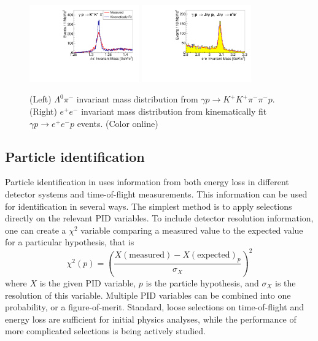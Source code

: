 \begin{figure}[tpb]
\begin{center}
\includegraphics[width=0.42\textwidth]{figures/XimMass_2017-ver30.pdf}
\includegraphics[width=0.42\textwidth]{figures/jpsi_mass.pdf}
\caption{\label{fig:invmass2}
(Left) $\Lambda^0\pi^-$ invariant mass distribution from $\gamma p \to K^+ K^+ \pi^- \pi^- p$. (Right) $e^+e^-$ invariant mass distribution from kinematically fit $\gamma p \to e^+e^- p$ events. (Color online)}
\end{center}
\end{figure}

\subsection{Particle identification \label{sec:perfpid}}

Particle identification in \gx{} uses information from both energy loss in different detector systems and time-of-flight measurements.  This information can be used for identification in several ways.  The simplest method is to apply selections directly on the relevant PID variables.  To include detector resolution information, one can create a $\chi^2$ variable comparing a measured value to the expected value for a particular hypothesis, that is
\begin{equation}
    \chi^2(p) = \left(  \frac{ X(\mathrm{measured}) - X(\mathrm{expected})_p}{\sigma_X} \right)^2
\end{equation}
where $X$ is the given PID variable, $p$ is the particle hypothesis, and $\sigma_X$ is the resolution of this variable.  Multiple PID variables can be combined into one probability, or a figure-of-merit.   Standard, loose selections on time-of-flight and energy loss are sufficient for initial physics analyses, while the performance of more complicated selections is being actively studied.


